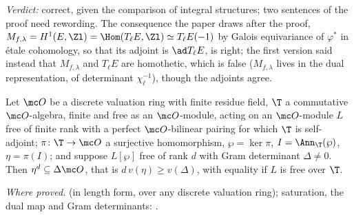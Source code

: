 \begin{sloppypar}
\noindent\emph{Verdict:} correct, given the comparison of integral structures; two sentences of the proof need rewording. The consequence the paper draws after the
proof, $M_{f,\lambda}=H^1(E,\Zl)=\Hom(T_\ell E,\Zl)\simeq T_\ell E(-1)$ by Galois equivariance of $\varphi^*$ in \'etale cohomology, so that its adjoint is $\ad T_\ell E$, is right; the
first version said instead that $M_{f,\lambda}$ and $T_\ell E$ are homothetic, which is false ($M_{f,\lambda}$ lives in the dual representation, of determinant $\chi_\ell^{-1}$), though the
adjoints agree.

\begin{lemma}\label{lem:paper:ddt417}
Let $\mc O$ be a discrete valuation ring with finite residue field, $\T$ a commutative $\mc O$-algebra, finite and free as an $\mc O$-module, acting on an $\mc O$-module $L$ free of finite rank
with a perfect $\mc O$-bilinear pairing for which $\T$ is self-adjoint; $\pi\colon\T\to\mc O$ a surjective homomorphism, $\wp=\ker\pi$, $I=\Ann_\T(\wp)$, $\eta=\pi(I)$; and suppose $L[\wp]$ free of rank $d$
with Gram determinant $\Delta\ne0$. Then $\eta^d\subseteq\Delta\mc O$, that is $d\,v(\eta)\ge v(\Delta)$, with equality if $L$ is free over $\T$.
\end{lemma}

\noindent\emph{Where proved.}  (in length form, over any discrete valuation ring); saturation, the dual map and Gram determinants: .


\end{sloppypar}
